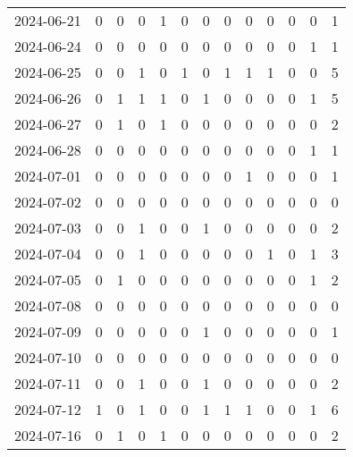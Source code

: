 \documentclass[dvipdfmx,oneside]{article}
\begin{document}
\begin{longtable}{lcccccccccccc}
        2024-06-21 &     0 &     0 &     0 &     1 &     0 &     0 &     0 &     0 &     0 &     0 &     0 &      1 \\
        2024-06-24 &     0 &     0 &     0 &     0 &     0 &     0 &     0 &     0 &     0 &     0 &     1 &      1 \\
        2024-06-25 &     0 &     0 &     1 &     0 &     1 &     0 &     1 &     1 &     1 &     0 &     0 &      5 \\
        2024-06-26 &     0 &     1 &     1 &     1 &     0 &     1 &     0 &     0 &     0 &     0 &     1 &      5 \\
        2024-06-27 &     0 &     1 &     0 &     1 &     0 &     0 &     0 &     0 &     0 &     0 &     0 &      2 \\
        2024-06-28 &     0 &     0 &     0 &     0 &     0 &     0 &     0 &     0 &     0 &     0 &     1 &      1 \\
        2024-07-01 &     0 &     0 &     0 &     0 &     0 &     0 &     0 &     1 &     0 &     0 &     0 &      1 \\
        2024-07-02 &     0 &     0 &     0 &     0 &     0 &     0 &     0 &     0 &     0 &     0 &     0 &      0 \\
        2024-07-03 &     0 &     0 &     1 &     0 &     0 &     1 &     0 &     0 &     0 &     0 &     0 &      2 \\
        2024-07-04 &     0 &     0 &     1 &     0 &     0 &     0 &     0 &     0 &     1 &     0 &     1 &      3 \\
        2024-07-05 &     0 &     1 &     0 &     0 &     0 &     0 &     0 &     0 &     0 &     0 &     1 &      2 \\
        2024-07-08 &     0 &     0 &     0 &     0 &     0 &     0 &     0 &     0 &     0 &     0 &     0 &      0 \\
        2024-07-09 &     0 &     0 &     0 &     0 &     0 &     1 &     0 &     0 &     0 &     0 &     0 &      1 \\
        2024-07-10 &     0 &     0 &     0 &     0 &     0 &     0 &     0 &     0 &     0 &     0 &     0 &      0 \\
        2024-07-11 &     0 &     0 &     1 &     0 &     0 &     1 &     0 &     0 &     0 &     0 &     0 &      2 \\
        2024-07-12 &     1 &     0 &     1 &     0 &     0 &     1 &     1 &     1 &     0 &     0 &     1 &      6 \\
        2024-07-16 &     0 &     1 &     0 &     1 &     0 &     0 &     0 &     0 &     0 &     0 &     0 &      2 \\

\end{longtable}
\end{document}
